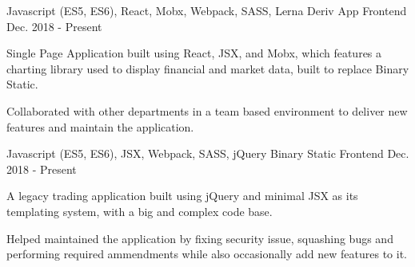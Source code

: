 

\begin{cventries}

  \cventry
    {Javascript (ES5, ES6), React, Mobx, Webpack, SASS, Lerna}
    {Deriv App}
    {Frontend}
    {Dec. 2018 - Present}
    {
      \begin{cvitems}
        \item {Single Page Application built using React, JSX, and Mobx, which features a charting library used to display financial and market data, built to replace Binary Static.}
        \item {Collaborated with other departments in a team based environment to deliver new features and maintain the application.}
      \end{cvitems}
    }

  \cventry
    {Javascript (ES5, ES6), JSX, Webpack, SASS, jQuery}
    {Binary Static}
    {Frontend}
    {Dec. 2018 - Present}
    {
      \begin{cvitems}
        \item {A legacy trading application built using jQuery and minimal JSX as its templating system, with a big and complex code base.}
        \item {Helped maintained the application by fixing security issue, squashing bugs and performing required ammendments while also occasionally add new features to it.}
      \end{cvitems}
    }

\end{cventries}
